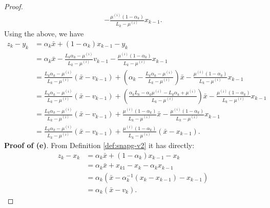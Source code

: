 \documentclass[12pt]{article}
\begin{document}
\begin{proof}
\begin{align*}
                - \frac{\mu^{(i)}(1 - \alpha_k)}{L_k - \mu^{(i)}} x_{k - 1}. 
            \end{align*}
            Using the above, we have 
            \begin{align*}
                z_k - y_k &= 
                \alpha_k \bar x + (1 - \alpha_k)x_{k - 1} - y_k
                \\
                &= \alpha_k \bar x 
                - \frac{L_k\alpha_k - \mu^{(i)}}{L_k - \mu^{(i)}} v_{k - 1} 
                - \frac{\mu^{(i)}(1 - \alpha_k)}{L_k - \mu^{(i)}} x_{k - 1}
                \\
                &= \frac{L_k\alpha_k - \mu^{(i)}}{L_k - \mu^{(i)}}(\bar x - v_{k - 1})
                + \left(
                    \alpha_k - \frac{L_k\alpha_k - \mu^{(i)}}{L_k - \mu^{(i)}}
                \right)\bar x
                - \frac{\mu^{(i)}(1 - \alpha_k)}{L_k - \mu^{(i)}} x_{k - 1}
                \\
                &= \frac{L_k\alpha_k - \mu^{(i)}}{L_k - \mu^{(i)}}(\bar x - v_{k - 1})
                + \left(
                    \frac{\alpha_kL_k - \alpha_k \mu^{(i)} - L_k\alpha_k + \mu^{(i)}}{L_k - \mu^{(i)}}
                \right)\bar x
                - \frac{\mu^{(i)}(1 - \alpha_k)}{L_k - \mu^{(i)}} x_{k - 1}
                \\
                &= \frac{L_k\alpha_k - \mu^{(i)}}{L_k - \mu^{(i)}}(\bar x - v_{k - 1})
                + \frac{\mu^{(i)}(1 - \alpha_k)}{L_k - \mu^{(i)}}\bar x
                - \frac{\mu^{(i)}(1 - \alpha_k)}{L_k - \mu^{(i)}} x_{k - 1}
                \\
                &= \frac{L_k\alpha_k - \mu^{(i)}}{L_k - \mu^{(i)}}(\bar x - v_{k - 1})
                + \frac{\mu^{(i)}(1 - \alpha_k)}{L_k - \mu^{(i)}}(\bar x - x_{k - 1}).
            \end{align*}
            \textbf{Proof of (e)}.
            From Definition \ref{def:snapg-v2} it has directly: 
            \begin{align*}
                z_k - x_k &= \alpha_k \bar x + (1 - \alpha_k)x_{k - 1} - x_k
                \\
                &= \alpha_k \bar x + x_{k  1} - x_k - \alpha_k x_{k - 1}
                \\
                &= \alpha_k(\bar x - \alpha_k^{-1}(x_k - x_{k - 1}) - x_{k - 1})
                \\
                &= \alpha_k (\bar x - v_k).
            \end{align*}

\end{proof}
\end{document}
